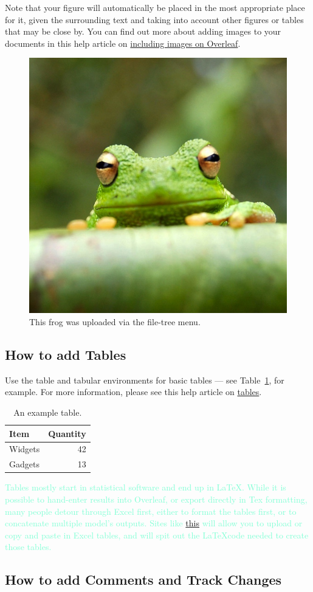 \documentclass{article}
\begin{document}
Note that your figure will automatically be placed in the most appropriate place for it, given the surrounding text and taking into account other figures or tables that may be close by. You can find out more about adding images to your documents in this help article on \href{https://www.overleaf.com/learn/how-to/Including_images_on_Overleaf}{including images on Overleaf}.

\begin{figure}
\centering
\includegraphics[width=0.25\linewidth]{frog.jpg} 
\caption{\label{fig:frog}This frog was uploaded via the file-tree menu.}
\end{figure}

\subsection{How to add Tables}

Use the table and tabular environments for basic tables --- see Table~\ref{tab:widgets}, for example. For more information, please see this help article on \href{https://www.overleaf.com/learn/latex/tables}{tables}. 

\begin{table}
\centering
\begin{tabular}{l|r}
Item & Quantity \\\hline
Widgets & 42 \\
Gadgets & 13
\end{tabular}
\caption{\label{tab:widgets}An example table.}
\end{table}

\textcolor{Aquamarine}{Tables mostly start in statistical software and end up in \LaTeX. While it is possible to hand-enter results into Overleaf, or export directly in Tex formatting, many people detour through Excel first, either to format the tables first, or to concatenate multiple model's outputs. Sites like \href{https://www.tablesgenerator.com/}{this} will allow you to upload or copy and paste in Excel tables, and will spit out the \LaTeX code needed to create those tables. }


\subsection{How to add Comments and Track Changes}
\end{document}
